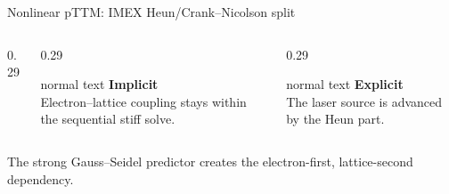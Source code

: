 \documentclass[aspectratio=169,10pt]{beamer}
\begin{document}
\begin{frame}[t]{Nonlinear pTTM: IMEX Heun/Crank--Nicolson split}
\begin{columns}[T,totalwidth=0.93\textwidth]
\begin{column}{0.29\textwidth}
    \end{column}
    \begin{column}{0.29\textwidth}
      \begin{beamercolorbox}[wd=\linewidth,sep=0.48em]{normal text}
        \scriptsize
        \textbf{\color{GVCouplingOrange}Implicit}\\
        Electron--lattice coupling stays within the sequential stiff solve.
      \end{beamercolorbox}
    \end{column}
    \begin{column}{0.29\textwidth}
      \begin{beamercolorbox}[wd=\linewidth,sep=0.48em]{normal text}
        \scriptsize
        \textbf{\color{GVSourceBlue}Explicit}\\
        The laser source is advanced by the Heun part.
      \end{beamercolorbox}
    \end{column}
  \end{columns}
  \vspace{0.10cm}
  \begin{center}
    \scriptsize\color{GVSlate}
    The strong Gauss--Seidel predictor creates the electron-first, lattice-second dependency.
  \end{center}
\end{frame}
\end{document}
